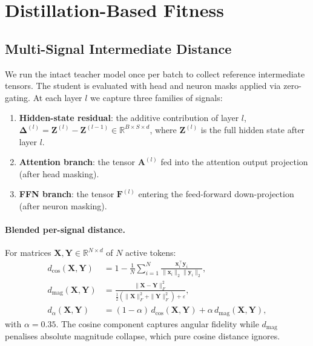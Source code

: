 \documentclass{article}
\newcommand{\Zb}{\mathbf{Z}}
\newcommand{\Ab}{\mathbf{A}}
\newcommand{\Fb}{\mathbf{F}}
\newcommand{\xb}{\mathbf{x}}
\newcommand{\yb}{\mathbf{y}}
\newcommand{\R}{\mathbb{R}}
\newcommand{\dcos}{d_{\mathrm{cos}}}
\newcommand{\dmag}{d_{\mathrm{mag}}}
\newcommand{\dblend}{d_{\alpha}}
\begin{document}
\section{Distillation-Based Fitness}
\label{sec:fitness}

\subsection{Multi-Signal Intermediate Distance}

We run the intact teacher model once per batch to collect reference
intermediate tensors.  The student is evaluated with head and neuron
masks applied via zero-gating.  At each layer $l$ we capture three
families of signals:
\begin{enumerate}[leftmargin=*,label=(\alph*)]
  \item \textbf{Hidden-state residual}: the additive contribution of
    layer $l$,
    $\bm{\Delta}^{(l)} = \Zb^{(l)} - \Zb^{(l-1)} \in \R^{B\times S\times d}$,
    where $\Zb^{(l)}$ is the full hidden state after layer $l$.
  \item \textbf{Attention branch}: the tensor $\Ab^{(l)}$ fed into the
    attention output projection (after head masking).
  \item \textbf{FFN branch}: the tensor $\Fb^{(l)}$ entering the
    feed-forward down-projection (after neuron masking).
\end{enumerate}

\paragraph{Blended per-signal distance.}
For matrices $\mathbf{X},\mathbf{Y}\in\R^{N\times d}$ of $N$ active tokens:
\begin{align}
  \dcos(\mathbf{X},\mathbf{Y})
    &= 1 - \frac{1}{N}\sum_{i=1}^{N}
       \frac{\xb_i^{\top}\yb_i}{\|\xb_i\|_2\|\yb_i\|_2},
  \label{eq:dcos} \\[4pt]
  \dmag(\mathbf{X},\mathbf{Y})
    &= \frac{\|\mathbf{X}-\mathbf{Y}\|_F^2}
           {\tfrac{1}{2}(\|\mathbf{X}\|_F^2+\|\mathbf{Y}\|_F^2)+\varepsilon},
  \label{eq:dmag}\\[4pt]
  \dblend(\mathbf{X},\mathbf{Y})
    &= (1-\alpha)\,\dcos(\mathbf{X},\mathbf{Y})
      + \alpha\,\dmag(\mathbf{X},\mathbf{Y}),
  \label{eq:dblend}
\end{align}
with $\alpha=0.35$.  The cosine component captures angular fidelity
while $\dmag$ penalises absolute magnitude collapse, which pure cosine
distance ignores.
\end{document}
